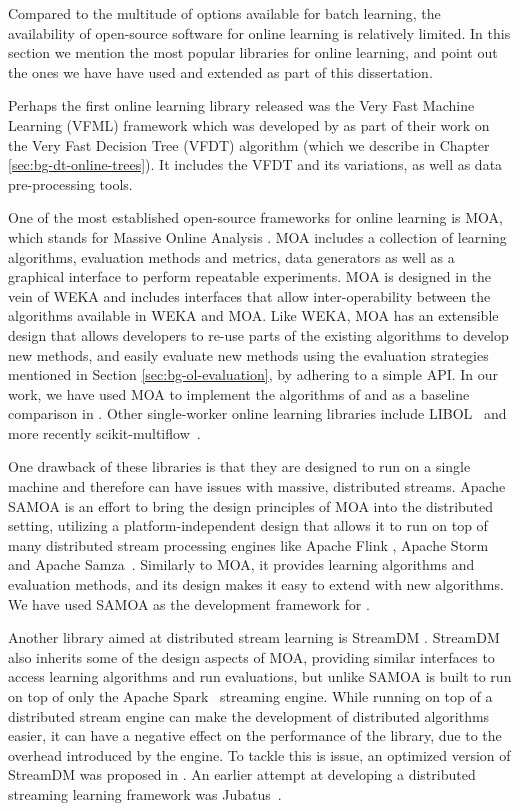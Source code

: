Compared to the multitude of options available for batch learning, the availability
of open-source software for online learning is relatively limited. In this section we
mention the most popular libraries for online learning, and point out the ones we have have used
and extended as part of this dissertation.

Perhaps the first online learning library released was the Very Fast Machine Learning (VFML) framework which was developed by \citet{vfdt} as part of their work on the Very Fast Decision Tree (VFDT) algorithm (which we describe in Chapter \ref{sec:bg-dt-online-trees}).
It includes the VFDT and its variations, as well as data pre-processing tools.

One of the most established open-source frameworks for online learning is MOA, which stands
for Massive Online Analysis \cite{bifet2010moa}. MOA includes a collection of
learning algorithms, evaluation methods and metrics, data generators as well as
a graphical interface to perform repeatable experiments. MOA is designed in the
vein of WEKA \cite{weka} and includes interfaces that allow inter-operability
between the algorithms available in WEKA and MOA. Like WEKA, MOA has an extensible
design that allows developers to re-use parts of the existing algorithms to develop
new methods, and easily evaluate new methods using the evaluation strategies mentioned
in Section \ref{sec:bg-ol-evaluation}, by adhering to a simple API. In our work,
we have used MOA to implement the algorithms of \uncertaintrees and as a baseline comparison
in \boostvht. Other single-worker online learning libraries
include LIBOL~\cite{libol} and more recently scikit-multiflow~\cite{sk-multiflow}.

One drawback of these libraries is that they are designed to run on a single machine and therefore
can have issues with massive, distributed streams. Apache SAMOA \cite{samoa} is an effort
to bring the design principles of MOA into the distributed setting, utilizing a platform-independent
design that allows it to run on top of many distributed stream processing engines like
Apache Flink \cite{flink}, Apache Storm~\cite{storm} and Apache Samza~\cite{samza}.
Similarly to MOA, it provides learning algorithms and evaluation methods, and its
design makes it easy to extend with new algorithms.
We have used SAMOA as the development framework for \boostvht.

Another library aimed at distributed stream learning is StreamDM \cite{streamdm}.
StreamDM also inherits some of the design aspects of MOA, providing similar interfaces
to access learning algorithms and run evaluations, but unlike SAMOA
is built to run on top of only the Apache Spark~\cite{spark} streaming engine.
While running on top of a distributed stream engine can make the development
of distributed algorithms easier, it can have a negative effect on the
performance of the library, due to the overhead introduced by the
engine. To tackle this is issue, an optimized version of StreamDM
was proposed in \cite{streamdmPP}. An earlier attempt at developing
a distributed streaming learning framework was Jubatus~\cite{jubatus}.


